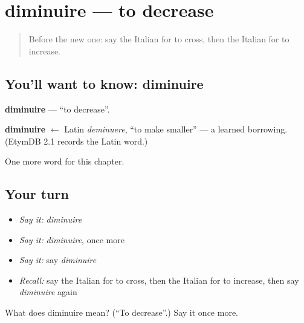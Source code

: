 \section[diminuire]{diminuire — to decrease}

\label{lesson:IT-C208-diminuire}



\begin{quote}
Before the new one: say the Italian for to cross, then the Italian for to increase.
\end{quote}

\subsection*{You'll want to know: diminuire}
\textbf{diminuire} — \textquotedblleft{}to decrease\textquotedblright{}.

\begin{cousinweb}
\textbf{diminuire} $\leftarrow$ Latin \emph{deminuere}, \textquotedblleft{}to make smaller\textquotedblright{} — a learned borrowing. (EtymDB 2.1 records the Latin word.)
\end{cousinweb}

\begin{grammarlens}[title={What you've built}]
One more word for this chapter.
\end{grammarlens}

\subsection*{Your turn}
\begin{itemize}
\raggedright
  \item \emph{Say it:} \emph{diminuire}
  \item \emph{Say it:} \emph{diminuire}, once more
  \item \emph{Say it:} say \emph{diminuire}
  \item \emph{Recall:} say the Italian for to cross, then the Italian for to increase, then say \emph{diminuire} again
\end{itemize}

\begin{tcolorbox}[breakable,colback=teal!4,colframe=teal!35!black,title={Before you move on}]
What does diminuire mean? (\textquotedblleft{}To decrease\textquotedblright{}.) Say it once more.
\end{tcolorbox}
